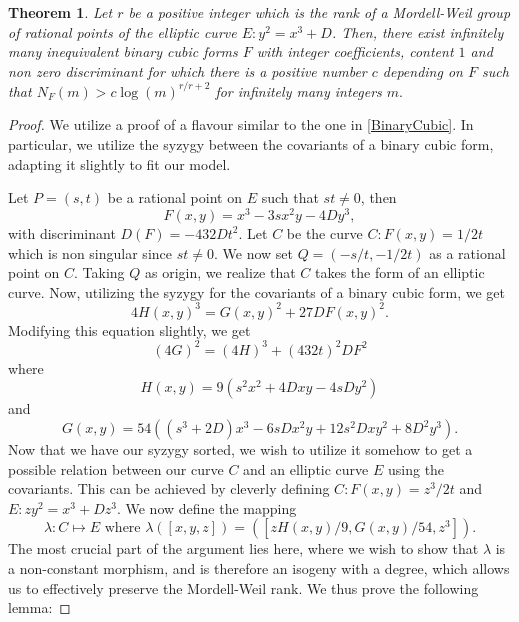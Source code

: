\documentclass[12pt]{amsart}
\theoremstyle{plain}
\newtheorem{thm}{Theorem}
\theoremstyle{definition}
\theoremstyle{remark}
\numberwithin{equation}{section}
\numberwithin{thm}{section}
\theoremstyle{named}
\theoremstyle{named}
\begin{document}
\begin{thm}
Let $r$ be a positive integer which is the rank of a Mordell-Weil group of rational points of the elliptic curve $E: y^2 = x^3 + D$. Then, there exist infinitely many inequivalent binary cubic forms $F$ with integer coefficients, content $1$ and non zero discriminant for which there is a positive number $c$ depending on $F$ such that $N_{F}(m) > c \log(m)^{r/r+2}$ for infinitely many integers $m.$
\end{thm} 
\begin{proof}
    

We utilize a proof of a flavour similar to the one in \ref{BinaryCubic}. In particular, we utilize the syzygy between the covariants of a binary cubic form, adapting it slightly to fit our model. 

Let $P= (s,t)$ be a rational point on $E$ such that $st \neq 0$, then $$F(x,y) = x^3 - 3sx^2y-4Dy^3,$$ with discriminant $D(F) = -432Dt^2$. Let $C$ be the curve $C: F(x,y) = 1/2t$ which is non singular since $st \neq 0.$ We now set $Q  = (-s/t, -1/2t)$ as a rational point on $C$. Taking $Q$ as origin, we realize that $C$ takes the form of an elliptic curve. Now, utilizing the syzygy for the covariants of a binary cubic form, we get $$4 H(x, y)^3=G(x, y)^2+27 D F(x, y)^2.$$ Modifying this equation slightly, we get $$(4G)^2 = (4H)^3 + (432t)^2 DF^2$$ where $$H(x, y) = 9(s^2 x^2 + 4D xy - 4s Dy^2)$$ and $$G(x, y) = 54 \left((s^3 + 2D)x^3 - 6sD x^2 y + 12s^2 D x y^2 + 8D^2 y^3 \right).$$
Now that we have our syzygy sorted, we wish to utilize it somehow to get a possible relation between our curve $C$ and an elliptic curve $E$ using the covariants. This can be achieved by cleverly defining $C: F(x,y) = z^3/2t$ and $E: zy^2 = x^3 + Dz^3$. We now define the mapping  $$ \lambda: C \mapsto E \textrm{ where } \lambda([x, y, z]) = \left(\left[ z H(x, y) / 9, G(x, y) / 54, z^3 \right]\right).$$ The most crucial part of the argument lies here, where we wish to show that $\lambda$ is a non-constant morphism, and is therefore an isogeny with a degree, which allows us to effectively preserve the Mordell-Weil rank. We thus prove the following lemma: 


\end{proof}
\end{document}
